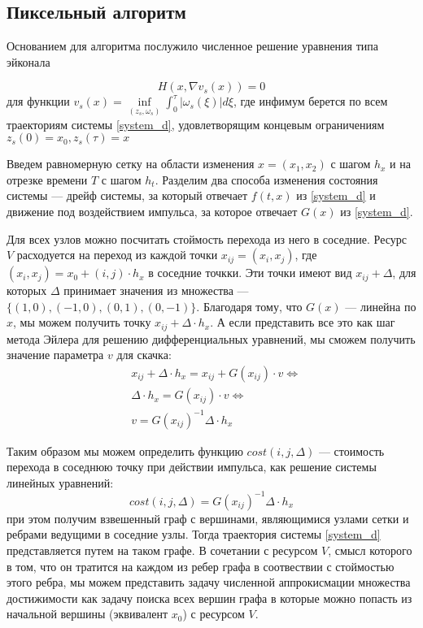 \subsection{Пиксельный алгоритм}
\label{sec:wave_alg}

Основанием для алгоритма послужило численное решение уравнения типа
эйконала \cite{S1999} 

\begin{equation*}
  H(x,\nabla v_s(x)) = 0
\end{equation*}
для функции $v_s(x) = \inf \limits_{(z_s,\omega_s)} \int_0^\tau
| \omega_s(\xi) | d\xi$, где инфимум берется по всем траекториям
системы \eqref{system_d}, удовлетворящим концевым ограничениям $z_s(0)
= x_0, z_s(\tau) = x$

Введем равномерную сетку на области изменения $x=(x_1,x_2)$ с шагом
$h_x$ и на отрезке времени $T$ с шагом $h_t$.
Разделим два способа изменения состояния системы — дрейф системы, за
который отвечает $f(t,x)$ из \eqref{system_d} и
движение под воздействием импульса, за которое отвечает $G(x)$ из
\eqref{system_d}.

Для всех узлов можно посчитать стоймость перехода из него в соседние.
Ресурс $V$ расходуется на переход из каждой точки
$x_{ij} = (x_i,x_j)$, где $(x_i,x_j) = x_0 + (i,j)\cdot h_x$ в
соседние точкки. Эти точки имеют вид $x_{ij} +\Delta$, для которых
$\Delta$ принимает значения из множества --- $
\{(1,0),(-1,0),(0,1),(0,-1)\}$.
Благодаря тому, что $G(x)$ --- линейна по $x$, мы можем получить точку
$x_{ij} +\Delta \cdot h_x$. А если представить все это как шаг метода
Эйлера для решению дифференциальных уравнений, мы сможем получить
значение параметра $v$ для скачка:
\begin{eqnarray*}
  &x_{ij} +\Delta \cdot h_x = x_{ij} + G(x_{ij})\cdot v \Leftrightarrow\\
  &\Delta \cdot h_x = G(x_{ij})\cdot v \Leftrightarrow\\
  &v = G(x_{ij})^{-1} \Delta \cdot h_x
\end{eqnarray*}

Таким образом мы можем определить функцию $cost(i,j,\Delta)$ ---
стоимость перехода в соседнюю точку при действии импульса, как решение
системы линейных уравнений:
$$cost(i,j,\Delta) = G(x_{ij})^{-1} \Delta \cdot h_x$$ при этом
получим взвешенный граф с вершинами, являющимися узлами сетки и
ребрами ведущими в соседние узлы. Тогда траектория системы
\eqref{system_d} представляется путем на таком графе. В сочетании с
ресурсом $V$, смысл которого в том, что он тратится на каждом из ребер
графа в соотвествии с стоймостью этого ребра, мы можем представить
задачу численной аппрокисмации множества достижимости как задачу
поиска всех вершин графа в которые можно попасть из начальной вершины
(эквивалент $x_0$) с ресурсом $V$. 

